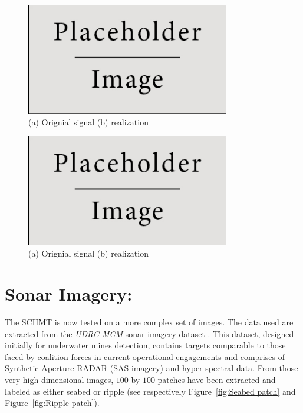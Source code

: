 \documentclass[a4paper,11pt]{report}
\begin{document}
		\begin{figure}
			\begin{center}
				\includegraphics[width=3.5in]{placeholder.jpg}
			  \caption[Shape classification: square]{(a) Orignial signal (b) realization}
			  \label{fig:Shape square}
			\end{center}
		\end{figure}
		
		\begin{figure}
			\begin{center}
				\includegraphics[width=3.5in]{placeholder.jpg}
			  \caption[Shape classification: triangle]{(a) Orignial signal (b) realization}
			  \label{fig:Shape triangle}
			\end{center}
		\end{figure}
		
  \section{Sonar Imagery:}
		\label{sec:Exp/Sonar:}
		The SCHMT is now tested on a more complex set of images. The data used are extracted from the \textit{UDRC MCM} sonar imagery dataset \cite{udrc}. This dataset, designed initially for underwater mines detection, contains targets comparable to those faced by coalition forces in current operational engagements and comprises of Synthetic Aperture RADAR (SAS imagery) and hyper-spectral data. From those very high dimensional images, $100$ by $100$ patches have been extracted and labeled as either seabed or ripple (see respectively Figure~\ref{fig:Seabed patch} and Figure~\ref{fig:Ripple patch}).\\
\end{document}
